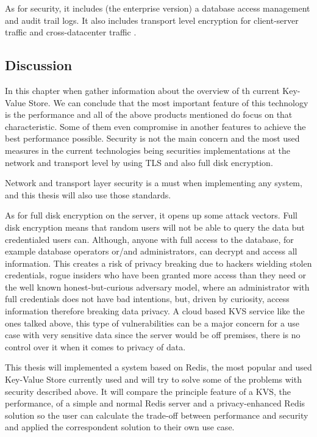 As for security, it includes (the enterprise version) a database access management and audit trail logs. It also includes transport level encryption for client-server traffic and cross-datacenter traffic \cite{aerospike:2}.

\subsection{Discussion}
\label{ssec:s1_discussion}

In this chapter when gather information about the overview of th current Key-Value Store. We can conclude that the most important feature of this technology is the performance and all of the above products mentioned do focus on that characteristic. Some of them even compromise in another features to achieve the best performance possible. Security is not the main concern and the most used measures in the current technologies being securities implementations at the network and transport level by using \gls{TLS} and also full disk encryption. 

Network and transport layer security is a must when implementing any system, and this thesis will also use those standards. 

As for full disk encryption on the server, it opens up some attack vectors. Full disk encryption means that random users will not be able to query the data but credentialed users can. Although, anyone with full access to the database, for example database operators or/and administrators, can decrypt and access all information. This creates a risk of privacy breaking due to hackers wielding stolen credentials, rogue insiders who have been granted more access than they need or the well known honest-but-curious adversary model, where an administrator with full credentials does not have bad intentions, but, driven by curiosity, access information therefore breaking data privacy. A cloud based \gls{KVS} service like the ones talked above, this type of vulnerabilities can be a major concern for a use case with very sensitive data since the server would be off premises, there is no control over it when it comes to privacy of data.

This thesis will implemented a system based on Redis, the most popular and used Key-Value Store currently used and will try to solve some of the problems with security described above. It will compare the principle feature of a \gls{KVS}, the performance, of a simple and normal Redis server and a privacy-enhanced Redis solution so the user can calculate the trade-off between performance and security and applied the correspondent solution to their own use case.

